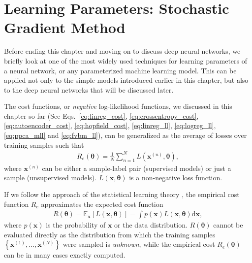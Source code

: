 \documentclass{now}
\newcommand{\vect}[1]{\mathbf{#1}}
\newcommand{\vects}[1]{\boldsymbol{#1}}
\newcommand{\vx}[0]{\vect{x}}
\newcommand{\TT}[0]{{\vects{\theta}}}
\newcommand{\E}[0]{\mathbb{E}}
\newcommand{\dd}[1]{\text{d}{#1}}
\begin{document}


\section{Learning Parameters: Stochastic Gradient Method}
\label{sec:stochastic_grad}

Before ending this chapter and moving on to discuss deep
neural networks, we briefly look at one of the most widely
used techniques for learning parameters of a neural network,
or any parameterized machine learning model.  This can be
applied not only to the simple models introduced
earlier in this chapter, but also to the deep neural networks
that will be discussed later.

The cost functions, or \textit{negative} log-likelihood
functions, we discussed in this chapter so far (See
Eqs.~\eqref{eq:linreg_cost}, \eqref{eq:crossentropy_cost},
\eqref{eq:autoencoder_cost}, \eqref{eq:hopfield_cost},
\eqref{eq:linreg_ll}, \eqref{eq:logreg_ll},
\eqref{eq:ppca_mll} and \eqref{eq:fvbm_ll}), can be
generalized as the average of losses over training samples such
that
\begin{align}
    \label{eq:slt_emp_cost}
    R_e(\TT) = \frac{1}{N} \sum_{n=1}^N L(\vx^{(n)}, \TT),
\end{align}
where $\vx^{(n)}$ can be either a sample-label pair
(supervised models) or just a sample (unsupervised models).
$L(\vx, \TT)$ is a non-negative loss function.

If we follow the approach of the statistical learning theory
\citep[see, e.g.][]{Vapnik1995}, the empirical cost function
$R_e$ approximates the expected cost function 
\begin{align}
    \label{eq:slt_exp_cost}
    R(\TT) = \E_{\vx} \left[ L(\vx, \TT) \right] = \int
    p(\vx) L(\vx, \TT) \dd{\vx},
\end{align}
where $p(\vx)$ is the probability of $\vx$ or the data
distribution. %
$R(\TT)$ cannot be evaluated directly
as the distribution from which the training samples $\left\{
\vx^{(1)}, \dots, \vx^{(N)} \right\}$ were sampled is
\textit{unknown}, while the empirical cost $R_e(\TT)$
can be in many cases exactly computed.
\end{document}
